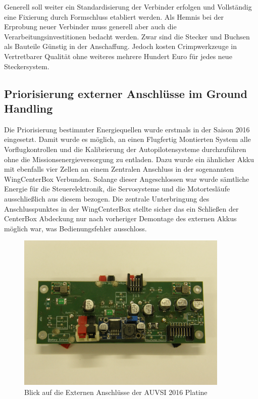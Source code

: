 Generell soll weiter ein Standardisierung der Verbinder erfolgen und Vollständig eine Fixierung durch Formschluss etabliert werden.
Als Hemnis bei der Erprobung neuer Verbinder muss generell aber auch die Verarbeitungsinvestitionen bedacht werden. Zwar sind die Stecker und Buchsen als Bauteile Günstig in der Anschaffung. Jedoch kosten Crimpwerkzeuge in Vertretbarer Qualität ohne weiteres mehrere Hundert Euro für jedes neue Steckersystem.





\subsection{Priorisierung externer Anschlüsse im Ground Handling}

Die Priorisierung bestimmter Energiequellen wurde erstmals in der Saison 2016 eingesetzt.
Damit wurde es möglich, an einen Flugfertig Montierten System alle Vorflugkontrollen und die Kalibrierung der Autopilotensysteme durchzuführen ohne die Missionsenergieversorgung zu entladen. Dazu wurde ein ähnlicher Akku mit ebenfalls vier Zellen an einem Zentralen Anschluss in der sogenannten WingCenterBox Verbunden. Solange dieser Angeschlossen war wurde sämtliche Energie für die Steuerelektronik, die Servosysteme und die Motortesläufe ausschließlich aus diesem bezogen. Die zentrale Unterbringung des Anschlusspunktes in der WingCenterBox stellte sicher das ein Schließen der CenterBox Abdeckung nur nach vorheriger Demontage des externen Akkus möglich war, was Bedienungsfehler ausschloss.

\begin{figure}[H]
\centering
\includegraphics[width=0.9\textwidth]{bilder/Centerbox/Centerbox-Front_Power_AUVSI_2016_Oberseite.jpg} 
\caption{Blick auf die Externen Anschlüsse der AUVSI 2016 Platine} 
\label{fig:Blick auf die Externen Anschlüsse der AUVSI 2016 Platine}
\end{figure}


